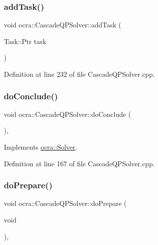 \subsubsection{\texorpdfstring{add\+Task()}{addTask()}}
{\footnotesize\ttfamily void ocra\+::\+Cascade\+Q\+P\+Solver\+::add\+Task (\begin{DoxyParamCaption}\item[{Task\+::\+Ptr}]{task }\end{DoxyParamCaption})}



Definition at line 232 of file Cascade\+Q\+P\+Solver.\+cpp.

\hypertarget{classocra_1_1CascadeQPSolver_af180fd8b7323b29246512af6109845d2}{}\label{classocra_1_1CascadeQPSolver_af180fd8b7323b29246512af6109845d2} 
\subsubsection{\texorpdfstring{do\+Conclude()}{doConclude()}}
{\footnotesize\ttfamily void ocra\+::\+Cascade\+Q\+P\+Solver\+::do\+Conclude (\begin{DoxyParamCaption}{ }\end{DoxyParamCaption})\hspace{0.3cm}{\ttfamily [protected]}, {\ttfamily [virtual]}}



Implements \hyperlink{classocra_1_1Solver_ac9d2d41d544b57a75e0d03db073d646e}{ocra\+::\+Solver}.



Definition at line 167 of file Cascade\+Q\+P\+Solver.\+cpp.

\hypertarget{classocra_1_1CascadeQPSolver_a2ccca21b47e23667be94cd215c890d5e}{}\label{classocra_1_1CascadeQPSolver_a2ccca21b47e23667be94cd215c890d5e} 
\subsubsection{\texorpdfstring{do\+Prepare()}{doPrepare()}}
{\footnotesize\ttfamily void ocra\+::\+Cascade\+Q\+P\+Solver\+::do\+Prepare (\begin{DoxyParamCaption}\item[{void}]{ }\end{DoxyParamCaption})\hspace{0.3cm}{\ttfamily [protected]}, {\ttfamily [virtual]}}



